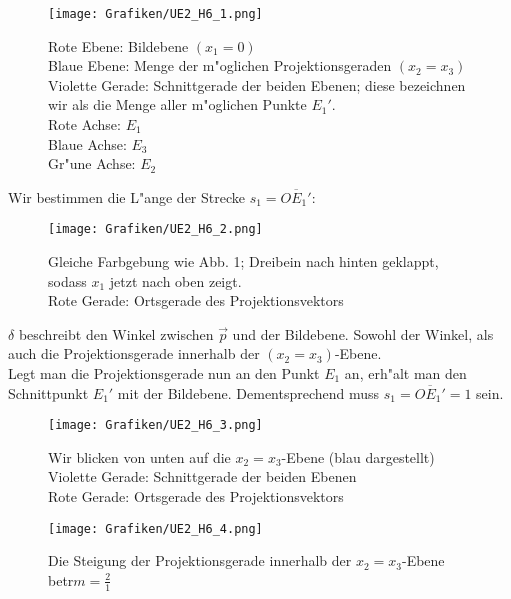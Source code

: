 \begin{Loesung}
\begin{figure}[H]
	\centering
	\texttt{[image: Grafiken/UE2\_H6\_1.png]}
	\caption{
		Rote Ebene: Bildebene \ensuremath{(x_1 = 0)}\\
		Blaue Ebene: Menge der m"oglichen Projektionsgeraden \ensuremath{(x_2 = x_3)}\\
		Violette Gerade: Schnittgerade der beiden Ebenen; diese bezeichnen wir als die Menge aller m"oglichen Punkte \ensuremath{E_1'}.\\
		Rote Achse: \ensuremath{E_1}\\
		Blaue Achse: \ensuremath{E_3}\\
		Gr"une Achse: \ensuremath{E_2}\\
		}
		\label{fig.H6}
\end{figure} 
\begin{Teilloesungen}
Wir bestimmen die L"ange der Strecke $s_1 = \overline{OE_1'}$:
\begin{figure}[H]
	\centering
	\texttt{[image: Grafiken/UE2\_H6\_2.png]}
	\caption{Gleiche Farbgebung wie Abb. 1; Dreibein nach hinten geklappt, sodass \ensuremath{x_1} jetzt nach oben zeigt.\\
	Rote Gerade: Ortsgerade des Projektionsvektors}		
	\label{fig.H6_2}
\end{figure}
\ensuremath{\delta} beschreibt den Winkel zwischen \ensuremath{\overrightarrow{p}} und der Bildebene. Sowohl der 	Winkel, als auch die Projektionsgerade innerhalb der \ensuremath{(x_2 = x_3)}-Ebene. \\		
		Legt man die Projektionsgerade nun an den Punkt \ensuremath{E_1} an, erh"alt man den Schnittpunkt \ensuremath{E_1'} mit der Bildebene. Dementsprechend muss \ensuremath{s_1 = \overline{OE_1'} = 1} sein.
\begin{figure}[H]
	\centering
	\texttt{[image: Grafiken/UE2\_H6\_3.png]}
	\caption{
	Wir blicken von unten auf die \ensuremath{x_2 = x_3}-Ebene (blau dargestellt) \\
	Violette Gerade: Schnittgerade der beiden Ebenen \\
	Rote Gerade: Ortsgerade des Projektionsvektors}
	\label{fig.H6_3}
\end{figure} 

\item \begin{figure}[H]
	\centering
	\texttt{[image: Grafiken/UE2\_H6\_4.png]}
	\caption{Die Steigung der Projektionsgerade innerhalb der \ensuremath{x_2 = x_3}-Ebene betr\agt \ensuremath{m = \frac{2}{1}}}
\end{figure} 


\end{Teilloesungen}
\end{Loesung}
